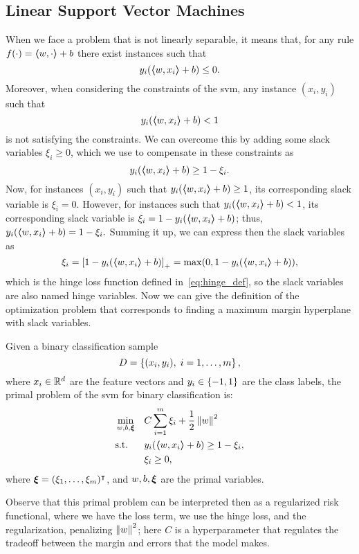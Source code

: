 \subsection{Linear Support Vector Machines}
%
When we face a problem that is not linearly separable, it means that, for any rule $f(\cdot) = \bm{\left\langle} w, \cdot \bm{\right\rangle} + b$ there exist instances such that 
$$ y_i (\bm{\left\langle} w, x_i \bm{\right\rangle} + b) \leq 0 .$$
Moreover, when considering the constraints of the \acrshort{svm}, any instance $(x_i, y_i)$ such that 
$$ y_i (\bm{\left\langle} w, x_i \bm{\right\rangle} + b) < 1 $$
is not satisfying the constraints.
%
We can overcome this by adding some slack variables $\xi_i \geq 0$, which we use to compensate in these constraints as
$$ y_i (\bm{\left\langle} w, x_i \bm{\right\rangle} + b) \geq 1 - \xi_i. $$
Now, for instances $(x_i, y_i)$ such that $y_i (\bm{\left\langle} w, x_i \bm{\right\rangle} + b) \geq 1$, its corresponding slack variable is $\xi_i = 0$. However, for instances such that $y_i (\bm{\left\langle} w, x_i \bm{\right\rangle} + b) < 1$, its corresponding slack variable is $\xi_i = 1 - y_i (\bm{\left\langle} w, x_i \bm{\right\rangle} + b)$; thus, $y_i (\bm{\left\langle} w, x_i \bm{\right\rangle} + b) = 1 - \xi_i .$
Summing it up, we can express then the slack variables as 
\begin{equation}
    \nonumber
    \xi_i = \left[1 - y_i (\bm{\left\langle} w, x_i \bm{\right\rangle} + b)\right]_{+} = \max(0, 1 - y_i (\bm{\left\langle} w, x_i \bm{\right\rangle} + b)),
\end{equation} 
which is the hinge loss function defined in~\eqref{eq:hinge_def}, so the slack variables are also named hinge variables. 
Now we can give the definition of the optimization problem that corresponds to finding a maximum margin hyperplane with slack variables.
\begin{definition}
    Given a binary classification sample
    $$ D = \left\{(x_i, y_i), \; i=1, \ldots, m\right\} ,$$
    where $x_i \in \mathbb{R}^d$ are the feature vectors and $y_i \in \left\{-1, 1\right\}$ are the class labels, 
    the primal problem of the \acrshort{svm} for binary classification is:
    \begin{equation}
        \label{eq:linear_primal_clas}
        \begin{aligned}
            &\min_{w, b, \fv{\xi}} & & C \sum_{i=1}^m \xi_i + \frac{1}{2} \norm{w}^2 \\
            & \text{s.t.} & & y_i (\dotp{w}{x_i} + b) \geq 1 - \xi_i , \\
            & & & \xi_i \geq 0 ,      
        \end{aligned}  
    \end{equation}
    where $\bm{\xi} = (\xi_1, \ldots, \xi_m)^\intercal$, and $w, b, \bm{\xi}$ are the primal variables.
\end{definition}
Observe that this primal problem can be interpreted then as a regularized risk functional, where we have the loss term, we use the hinge loss, and the regularization, penalizing $\left\lVert w\right\rVert^2$; here $C$ is a hyperparameter that regulates the tradeoff between the margin and errors that the model makes.

